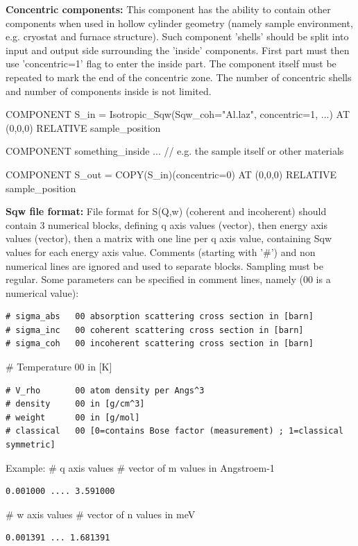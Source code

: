 \textbf{Concentric components:} This component has the ability to contain other components when used in hollow cylinder geometry (namely sample environment, e.g. cryostat and furnace structure). Such component 'shells' should be split into input and output side surrounding the 'inside' components. First part must then use 'concentric=1' flag to enter the inside part. The component itself must be repeated to mark the end of the concentric zone. The number of concentric shells and number of components inside is not limited.

COMPONENT S\_in = Isotropic\_Sqw(Sqw\_coh="Al.laz", concentric=1, ...) AT (0,0,0) RELATIVE sample\_position

COMPONENT something\_inside ... // e.g. the sample itself or other materials

COMPONENT S\_out = COPY(S\_in)(concentric=0) AT (0,0,0) RELATIVE sample\_position

\textbf{Sqw file format:} File format for S(Q,w) (coherent and incoherent) should contain 3 numerical blocks, defining q axis values (vector), then energy axis values (vector), then a matrix with one line per q axis value, containing Sqw values for each energy axis value. Comments (starting with '\#') and non numerical lines are ignored and used to separate blocks. Sampling must be regular. Some parameters can be specified in comment lines, namely (00 is a numerical value):

\begin{verbatim}
# sigma_abs   00 absorption scattering cross section in [barn]
# sigma_inc   00 coherent scattering cross section in [barn]
# sigma_coh   00 incoherent scattering cross section in [barn]
\end{verbatim}

\# Temperature 00 in [K]

\begin{verbatim}
# V_rho       00 atom density per Angs^3
# density     00 in [g/cm^3]
# weight      00 in [g/mol]
# classical   00 [0=contains Bose factor (measurement) ; 1=classical symmetric]
\end{verbatim}

Example: \# q axis values \# vector of m values in Angstroem-1

\begin{verbatim}
0.001000 .... 3.591000
\end{verbatim}

\# w axis values \# vector of n values in meV

\begin{verbatim}
0.001391 ... 1.681391
\end{verbatim}

